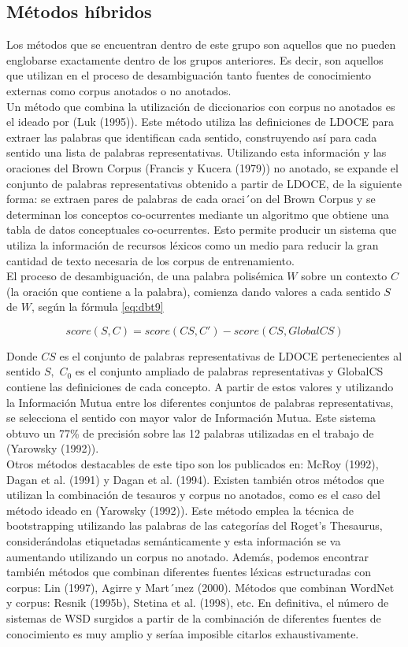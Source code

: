 \subsection{Métodos híbridos}
Los métodos que se encuentran dentro de este grupo son aquellos que no pueden englobarse exactamente dentro de los grupos anteriores. Es decir, son aquellos que utilizan en el proceso de desambiguación tanto fuentes de conocimiento externas como corpus anotados o no anotados.\\
Un método que combina la utilización de diccionarios con corpus no anotados es el ideado por (Luk (1995)). Este método utiliza las definiciones de LDOCE para extraer las palabras que identifican cada sentido, construyendo así para cada sentido una lista de palabras representativas. Utilizando esta información y las oraciones del Brown Corpus (Francis y Kucera (1979)) no anotado, se expande el conjunto de palabras representativas obtenido a partir de LDOCE, de la siguiente forma: se extraen pares de palabras de cada oraci´on del Brown Corpus y se determinan los conceptos co-ocurrentes mediante un algoritmo que obtiene una tabla de datos conceptuales co-ocurrentes. Esto permite producir un sistema que utiliza la información de recursos léxicos como un medio para reducir la gran cantidad de texto necesaria de los corpus de entrenamiento.\\
El proceso de desambiguación,  de una palabra polisémica $W$ sobre un contexto $C$ (la oración que contiene a la palabra), comienza dando valores a cada sentido $S$ de $W$, según la fórmula \ref{eq:dbt9}

\begin{equation}
  score(S,C)=score(CS,C')-score(CS,GlobalCS)
  \label{eq:dbt9}
\end{equation}

Donde $CS$ es el conjunto de palabras representativas de LDOCE pertenecientes al sentido $S,$ $C_0$ es el conjunto ampliado de palabras representativas y GlobalCS contiene las definiciones de cada concepto. A partir de estos valores y utilizando la Información Mutua entre los diferentes conjuntos de palabras representativas, se selecciona el sentido con mayor valor de Información Mutua. Este sistema obtuvo un 77\% de precisión sobre las 12 palabras utilizadas en el trabajo de (Yarowsky (1992)).\\
Otros métodos destacables de este tipo son los publicados en: McRoy (1992), Dagan et al. (1991) y Dagan et al. (1994). Existen también otros métodos que utilizan la combinación de tesauros y corpus no anotados, como es el caso del método ideado en (Yarowsky (1992)). Este método emplea la técnica de bootstrapping utilizando las palabras de las categorías del Roget’s Thesaurus, considerándolas etiquetadas semánticamente y esta información se va aumentando utilizando un corpus no anotado. Además, podemos encontrar también métodos que combinan diferentes fuentes léxicas estructuradas con corpus: Lin (1997), Agirre y Mart´ınez (2000). Métodos que combinan WordNet y corpus: Resnik (1995b), Stetina et al. (1998), etc. En definitiva, el número de sistemas de WSD surgidos a partir de la combinación de diferentes fuentes de conocimiento es muy amplio y seríaa imposible citarlos exhaustivamente.

